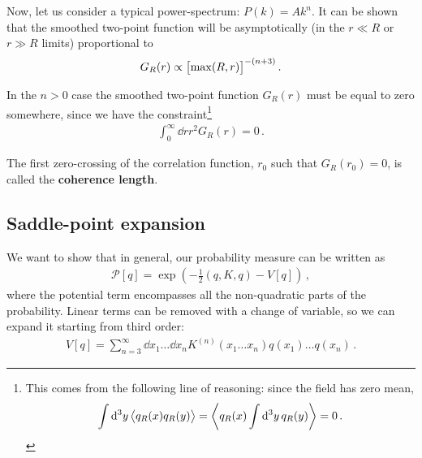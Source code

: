 \documentclass[main.tex]{subfiles}
\begin{document}
Now, let us consider a typical power-spectrum: \(P(k) = A k^{n}\). 
It can be shown that the smoothed two-point function will be asymptotically (in the \(r \ll R\) or \(r \gg R\) limits) proportional to
%
\begin{align}
G_R (r) \propto \qty[\max(R, r)]^{- (n+3)}
\,.
\end{align}




In the \(n > 0\) case the smoothed two-point function \(G_R(r)\) must be equal to zero somewhere, since we have the constraint\footnote{This comes from the following line of reasoning: since the field has zero mean, 
%
\begin{align}
\int \dd[3]{y} \expval{q_R (x) q_R (y)} = \expval{q_R (x) \int \dd[3]{y} q_R(y)} = 0
\,.
\end{align}}
%
\begin{align}
\int_0^{\infty } \dd{r} r^2 G_R(r) = 0
\,.
\end{align}


The first zero-crossing of the correlation function, \(r_0 \) such that \(G_R(r_0 ) = 0\), is called the \textbf{coherence length}. 


\subsection{Saddle-point expansion}

We want to show that in general, our probability measure can be written as 
%
\begin{align}
\mathcal{P}[q] = \exp(- \frac{1}{2} (q, K, q) - V[q])
\,,
\end{align}
%
where the potential term encompasses all the non-quadratic parts of the probability.
Linear terms can be removed with a change of variable, so we can expand it starting from third order: 
%
\begin{align}
V[q] = \sum _{n=3}^{\infty } \dd{x_1 } \dots \dd{x_n} K^{(n)} (x_1 \dots x_n) q(x_1 )\dots q(x_n)
\,.
\end{align}
\end{document}
